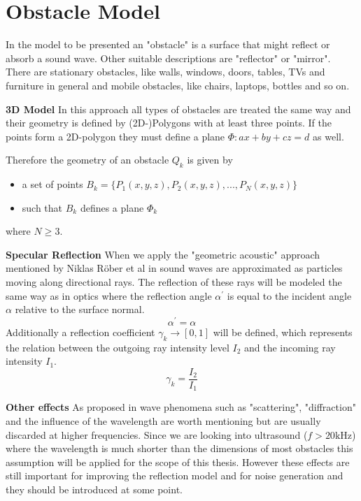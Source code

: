 \section{Obstacle Model}\label{sec:obstacle}
In the model to be presented an "obstacle" is a surface that might reflect or absorb a sound wave.
Other suitable descriptions are "reflector" or "mirror". 
There are stationary obstacles, like walls, windows, doors, tables, TVs and furniture in general and mobile obstacles, like chairs, laptops, bottles and so on.

\textbf{3D Model}\newline
In this approach all types of obstacles are treated the same way and their geometry is defined by (2D-)Polygons with at least three points. If the points form a 2D-polygon they must define a plane $\Phi: ax + by + cz = d$ as well.



Therefore the geometry of an obstacle $Q_k$ is given by
\begin{itemize}
    \item a set of points $B_k = \{P_1(x,y,z), P_2(x,y,z), ..., P_N(x,y,z)\}$
    \item such that $B_k$ defines a plane $\Phi_k$
\end{itemize}
where $N \geq 3$.

\textbf{Specular Reflection}\newline
When we apply the "geometric acoustic" approach mentioned by Niklas Röber et al in \cite{rober2007ray} sound waves are approximated as particles moving along directional rays.
The reflection of these rays will be modeled the same way as in optics where the reflection angle $\alpha^{'}$ is equal to the incident angle $\alpha$ relative to the surface normal.
\begin{equation}
    \alpha^{'} = \alpha
\end{equation}
Additionally a reflection coefficient $\gamma_k \rightarrow [0,1]$ will be defined, which represents the relation between the outgoing ray intensity level $I_2$ and the incoming ray intensity $I_1$.
\begin{equation}
    \gamma_k = \frac{I_2}{I_1}
\end{equation}

\textbf{Other effects}\newline
As proposed in \cite{rober2007ray} wave phenomena such as "scattering", "diffraction" and the influence of the wavelength are worth mentioning but are usually discarded at higher frequencies.
Since we are looking into ultrasound ($f > 20\text{kHz}$) where the wavelength is much shorter than the dimensions of most obstacles this assumption will be applied for the scope of this thesis.
However these effects are still important for improving the reflection model and for noise generation and they should be introduced at some point.

